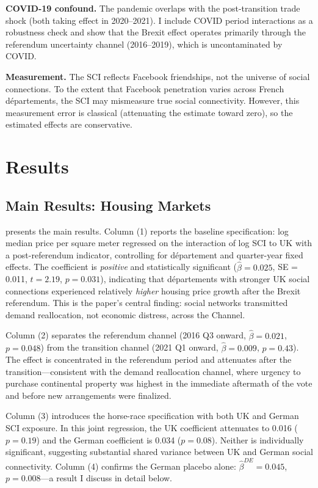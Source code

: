 \documentclass[12pt]{article}
\begin{document}
\textbf{COVID-19 confound.} The pandemic overlaps with the post-transition trade shock (both taking effect in 2020--2021). I include COVID period interactions as a robustness check and show that the Brexit effect operates primarily through the referendum uncertainty channel (2016--2019), which is uncontaminated by COVID.

\textbf{Measurement.} The SCI reflects Facebook friendships, not the universe of social connections. To the extent that Facebook penetration varies across French d\'epartements, the SCI may mismeasure true social connectivity. However, this measurement error is classical (attenuating the estimate toward zero), so the estimated effects are conservative.


\section{Results}

\subsection{Main Results: Housing Markets}

 presents the main results. Column (1) reports the baseline specification: log median price per square meter regressed on the interaction of log SCI to UK with a post-referendum indicator, controlling for d\'epartement and quarter-year fixed effects. The coefficient is \textit{positive} and statistically significant ($\hat{\beta} = 0.025$, SE = 0.011, $t = 2.19$, $p = 0.031$), indicating that d\'epartements with stronger UK social connections experienced relatively \textit{higher} housing price growth after the Brexit referendum. This is the paper's central finding: social networks transmitted demand reallocation, not economic distress, across the Channel.

Column (2) separates the referendum channel (2016 Q3 onward, $\hat{\beta} = 0.021$, $p = 0.048$) from the transition channel (2021 Q1 onward, $\hat{\beta} = 0.009$, $p = 0.43$). The effect is concentrated in the referendum period and attenuates after the transition---consistent with the demand reallocation channel, where urgency to purchase continental property was highest in the immediate aftermath of the vote and before new arrangements were finalized.

Column (3) introduces the horse-race specification with both UK and German SCI exposure. In this joint regression, the UK coefficient attenuates to 0.016 ($p = 0.19$) and the German coefficient is 0.034 ($p = 0.08$). Neither is individually significant, suggesting substantial shared variance between UK and German social connectivity. Column (4) confirms the German placebo alone: $\hat{\beta}^{DE} = 0.045$, $p = 0.008$---a result I discuss in detail below.
\end{document}
